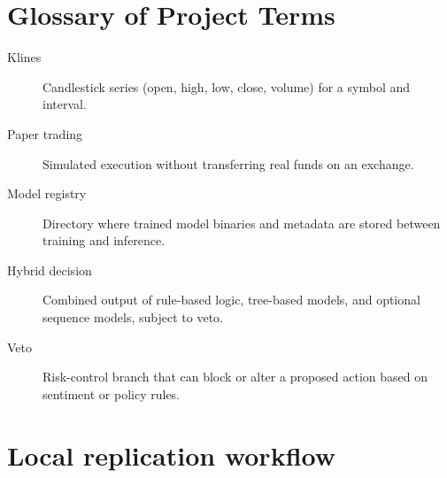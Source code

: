 \begin{table}[ht]
\centering
\caption{Common environment variables (names only; values are deployment-specific).}
\label{app:tab-env}
\end{table}

\section{Glossary of Project Terms}

\begin{description}
\item[Klines] Candlestick series (open, high, low, close, volume) for a symbol and interval.
\item[Paper trading] Simulated execution without transferring real funds on an exchange.
\item[Model registry] Directory where trained model binaries and metadata are stored between training and inference.
\item[Hybrid decision] Combined output of rule-based logic, tree-based models, and optional sequence models, subject to veto.
\item[Veto] Risk-control branch that can block or alter a proposed action based on sentiment or policy rules.
\end{description}

\section{Local replication workflow}

